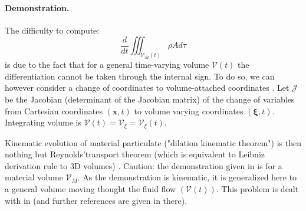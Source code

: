 \paragraph{Demonstration.}
The difficulty to compute:
\begin{equation}
 \displaystyle
 \frac{d}{dt} \iiint_{\mathcal{V}_M(t)} \rho A d\tau
\end{equation}
is due to the fact that for a general time-varying volume $\mathcal{V}(t)$ the differentiation cannot be taken through the internal sign. To do so, we can however consider a change of coordinates to volume-attached coordinates \citep{hirasaki_chapter_2021}. Let $\mathcal{J}$ be the Jacobian (determinant of the Jacobian matrix) of the change of variables from Cartesian coordinates $(\mathbf{x},t)$ to volume varying coordinates $(\boldsymbol{\xi},t)$. Integrating volume is $\mathcal{V}(t)=\mathcal{V}_{\xi}=\mathcal{V}_{\xi}(t)$.

Kinematic evolution of material particulate ("dilation kinematic theorem") is then nothing but Reynolds'transport theorem (which is equivalent to Leibniz derivation rule to 3D volumes) \citep{hirasaki_chapter_2021}. Caution: the demonstration given in \citep{hirasaki_chapter_2021} is for a material volume $\mathcal{V}_M$. As the demonstration is kinematic, it is generalized here to a general volume moving thought the fluid flow $(\mathcal{V}(t))$. This problem is dealt with in \cite{web_course_web_2021} (and further references are given in there).

